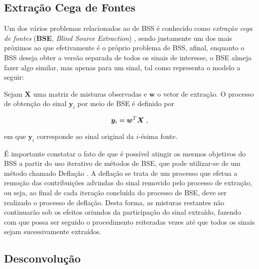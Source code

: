 \subsection{Extração Cega de Fontes}
\label{subsec:bss_bse}

Um dos vários problemas relacionados ao de BSS é conhecido como \textit{extração cega de fontes} (\textbf{BSE}, \textit{Blind Source Extraction}) \citep{5967775}, sendo justamente um dos mais próximos ao que efetivamente é o próprio problema de BSS, afinal, enquanto o BSS deseja obter a versão separada de todos os sinais de interesse, o BSE almeja fazer algo similar, mas apenas para um sinal, tal como representa o modelo a seguir: \\


\begin{definition}

    Sejam $\bm{X}$ uma matriz de misturas observadas e $\bm{w}$ o vetor de extração. O processo de obtenção do sinal $\bm{y}_{i}$ por meio de BSE é definido por

    \begin{equation}
        \bm{y}_{i} = \bm{w}^{T} \bm{X}
        \label{eq:bss_bse}
        \hspace{0.1cm},
        \vspace{0.2cm}
    \end{equation}

    \noindent em que $\bm{y}_{i}$ corresponde ao sinal original da $i$-ésima fonte.

\end{definition}

É importante constatar o fato de que é possível atingir os mesmos objetivos do BSS a partir do uso iterativo de métodos de BSE, que pode utilizar-se de um método chamado Deflação \citep{DELFOSSE199559}. A deflação se trata de um processo que efetua a remoção das contribuições advindas do sinal removido pelo processo de extração, ou seja, ao final de cada iteração concluída do processo de BSE, deve ser realizado o processo de deflação. Desta forma, as misturas restantes não continuarão sob os efeitos oriundos da participação do sinal extraído, fazendo com que possa ser seguido o procedimento reiteradas vezes até que todos os sinais sejam sucessivamente extraídos.



\subsection{Desconvolução}
\label{subsec:bss_deconvolution}

